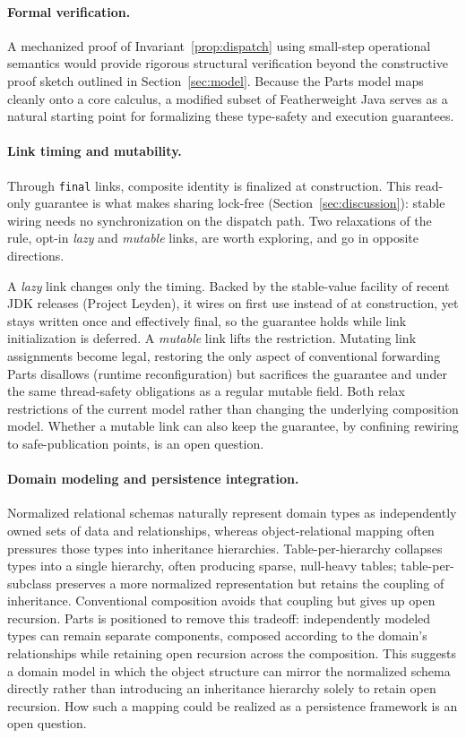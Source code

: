 \documentclass[acmsmall,screen,review,anonymous]{acmart}
\theoremstyle{acmplain}
\newcommand{\code}[1]{\texttt{#1}}
\begin{document}
\paragraph{Formal verification.}
A mechanized proof of Invariant~\ref{prop:dispatch} using small-step operational semantics would provide rigorous structural
verification beyond the constructive proof sketch outlined in Section~\ref{sec:model}. Because the Parts model maps cleanly
onto a core calculus, a modified subset of Featherweight Java serves as a natural starting point for formalizing these type-safety
and execution guarantees.

\paragraph{Link timing and mutability.}
Through \code{final} links, composite identity is finalized at construction. This read-only guarantee is what makes sharing
lock-free (Section~\ref{sec:discussion}): stable wiring needs no synchronization on the dispatch path. Two relaxations of
the rule, opt-in \emph{lazy} and \emph{mutable} links, are worth exploring, and go in opposite directions.

A \emph{lazy} link changes only the timing. Backed by the stable-value facility of recent
JDK releases (Project Leyden), it wires on first use instead of at construction, yet stays written once and
effectively final, so the guarantee holds while link initialization is deferred. A \emph{mutable} link
lifts the restriction. Mutating link assignments become legal, restoring the only aspect
of conventional forwarding Parts disallows (runtime reconfiguration) but sacrifices the
guarantee and under the same thread-safety obligations as a regular mutable field.
Both relax restrictions of the current model rather than changing the underlying composition model.
Whether a mutable link can also keep the guarantee, by confining rewiring to safe-publication points, is an open question.

\paragraph{Domain modeling and persistence integration.}
Normalized relational schemas naturally represent domain types as independently owned sets of data and relationships, whereas
object-relational mapping often pressures those types into inheritance hierarchies. Table-per-hierarchy collapses types
into a single hierarchy, often producing sparse, null-heavy tables; table-per-subclass preserves a more normalized representation
but retains the coupling of inheritance. Conventional composition avoids that coupling but gives up open recursion. Parts
is positioned to remove this tradeoff: independently modeled types can remain separate components, composed according to the domain's relationships
while retaining open recursion across the composition. This suggests a domain model in which the object structure can mirror
the normalized schema directly rather than introducing an inheritance hierarchy solely to retain open recursion. How such
a mapping could be realized as a persistence framework is an open question.
\end{document}
